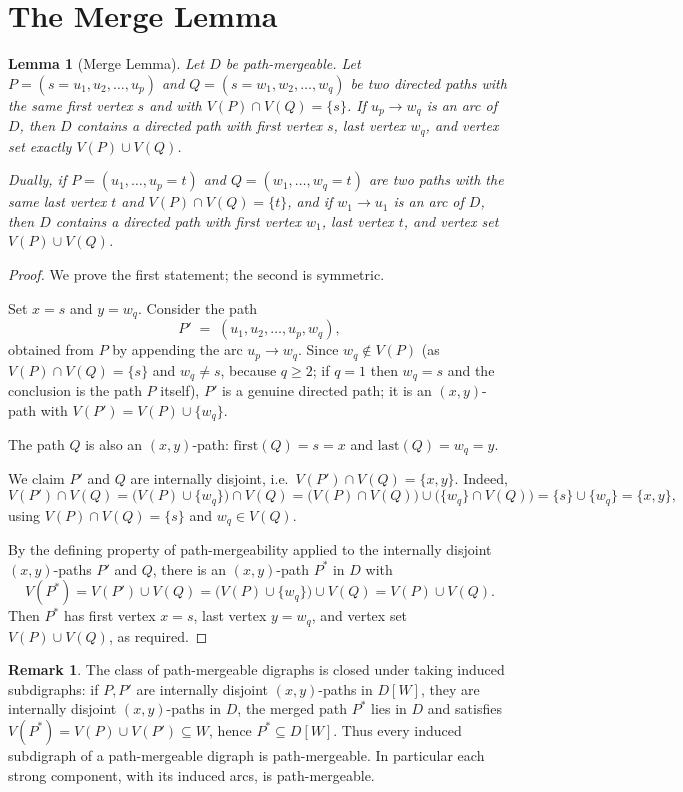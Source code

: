 \documentclass[12pt]{article}
\newtheorem{lemma}{Lemma}
\theoremstyle{definition}
\newtheorem{remark}{Remark}
\begin{document}
\section{The Merge Lemma}\label{sec:merge}

\begin{lemma}[Merge Lemma]\label{lem:merge}
Let $D$ be path-mergeable. Let
$P=(s=u_{1},u_{2},\dots,u_{p})$ and $Q=(s=w_{1},w_{2},\dots,w_{q})$ be two directed
paths with the same first vertex $s$ and with $V(P)\cap V(Q)=\{s\}$. If
$u_{p}\to w_{q}$ is an arc of $D$, then $D$ contains a directed path with first
vertex $s$, last vertex $w_{q}$, and vertex set exactly $V(P)\cup V(Q)$.

Dually, if $P=(u_{1},\dots,u_{p}=t)$ and $Q=(w_{1},\dots,w_{q}=t)$ are two paths
with the same last vertex $t$ and $V(P)\cap V(Q)=\{t\}$, and if $w_{1}\to u_{1}$ is
an arc of $D$, then $D$ contains a directed path with first vertex $w_{1}$, last
vertex $t$, and vertex set $V(P)\cup V(Q)$.
\end{lemma}

\begin{proof}
We prove the first statement; the second is symmetric.

Set $x=s$ and $y=w_{q}$. Consider the path
\[
P' \;=\; (u_{1},u_{2},\dots,u_{p},w_{q}),
\]
obtained from $P$ by appending the arc $u_{p}\to w_{q}$. Since
$w_{q}\notin V(P)$ (as $V(P)\cap V(Q)=\{s\}$ and $w_{q}\neq s$, because $q\ge 2$;
if $q=1$ then $w_{q}=s$ and the conclusion is the path $P$ itself), $P'$ is a
genuine directed path; it is an $(x,y)$-path with
$V(P')=V(P)\cup\{w_{q}\}$.

The path $Q$ is also an $(x,y)$-path: $\mathrm{first}(Q)=s=x$ and
$\mathrm{last}(Q)=w_{q}=y$.

We claim $P'$ and $Q$ are internally disjoint, i.e.\ $V(P')\cap V(Q)=\{x,y\}$.
Indeed,
\[
V(P')\cap V(Q)=\bigl(V(P)\cup\{w_{q}\}\bigr)\cap V(Q)
=\bigl(V(P)\cap V(Q)\bigr)\cup\bigl(\{w_{q}\}\cap V(Q)\bigr)
=\{s\}\cup\{w_{q}\}=\{x,y\},
\]
using $V(P)\cap V(Q)=\{s\}$ and $w_{q}\in V(Q)$.

By the defining property of path-mergeability applied to the internally disjoint
$(x,y)$-paths $P'$ and $Q$, there is an $(x,y)$-path $P^{*}$ in $D$ with
\[
V(P^{*})=V(P')\cup V(Q)=\bigl(V(P)\cup\{w_{q}\}\bigr)\cup V(Q)=V(P)\cup V(Q).
\]
Then $P^{*}$ has first vertex $x=s$, last vertex $y=w_{q}$, and vertex set
$V(P)\cup V(Q)$, as required.
\end{proof}

\begin{remark}\label{rem:closure}
The class of path-mergeable digraphs is closed under taking induced subdigraphs: if
$P,P'$ are internally disjoint $(x,y)$-paths in $D[W]$, they are internally
disjoint $(x,y)$-paths in $D$, the merged path $P^{*}$ lies in $D$ and satisfies
$V(P^{*})=V(P)\cup V(P')\subseteq W$, hence $P^{*}\subseteq D[W]$. Thus every
induced subdigraph of a path-mergeable digraph is path-mergeable. In particular
each strong component, with its induced arcs, is path-mergeable.
\end{remark}
\end{document}
